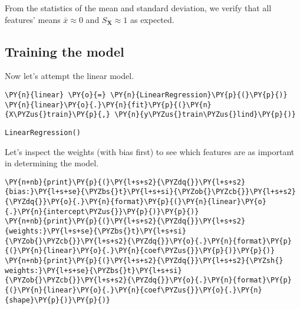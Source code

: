    From the statistics of the mean and standard deviation, we verify that
all features' means \(\bar{x} \approx 0\) and
\(S_{\mathbf{X}} \approx 1\) as expected.

    \hypertarget{training-the-model}{%
\subsection{Training the model}\label{training-the-model}}

    Now let's attempt the linear model.

    \begin{tcolorbox}[breakable, size=fbox, boxrule=1pt, pad at break*=1mm,colback=cellbackground, colframe=cellborder]
\begin{Verbatim}[commandchars=\\\{\}]
\PY{n}{linear} \PY{o}{=} \PY{n}{LinearRegression}\PY{p}{(}\PY{p}{)}
\PY{n}{linear}\PY{o}{.}\PY{n}{fit}\PY{p}{(}\PY{n}{X\PYZus{}train}\PY{p}{,} \PY{n}{y\PYZus{}train\PYZus{}lind}\PY{p}{)}
\end{Verbatim}
\end{tcolorbox}

            \begin{tcolorbox}[breakable, size=fbox, boxrule=.5pt, pad at break*=1mm, opacityfill=0]
\begin{Verbatim}[commandchars=\\\{\}]
LinearRegression()
\end{Verbatim}
\end{tcolorbox}
        
    Let's inspect the weights (with bias first) to see which features are as
important in determining the model.

    \begin{tcolorbox}[breakable, size=fbox, boxrule=1pt, pad at break*=1mm,colback=cellbackground, colframe=cellborder]
\begin{Verbatim}[commandchars=\\\{\}]
\PY{n+nb}{print}\PY{p}{(}\PY{l+s+s2}{\PYZdq{}}\PY{l+s+s2}{bias:}\PY{l+s+se}{\PYZbs{}t}\PY{l+s+si}{\PYZob{}\PYZcb{}}\PY{l+s+s2}{\PYZdq{}}\PY{o}{.}\PY{n}{format}\PY{p}{(}\PY{n}{linear}\PY{o}{.}\PY{n}{intercept\PYZus{}}\PY{p}{)}\PY{p}{)}
\PY{n+nb}{print}\PY{p}{(}\PY{l+s+s2}{\PYZdq{}}\PY{l+s+s2}{weights:}\PY{l+s+se}{\PYZbs{}t}\PY{l+s+si}{\PYZob{}\PYZcb{}}\PY{l+s+s2}{\PYZdq{}}\PY{o}{.}\PY{n}{format}\PY{p}{(}\PY{n}{linear}\PY{o}{.}\PY{n}{coef\PYZus{}}\PY{p}{)}\PY{p}{)}
\PY{n+nb}{print}\PY{p}{(}\PY{l+s+s2}{\PYZdq{}}\PY{l+s+s2}{\PYZsh{} weights:}\PY{l+s+se}{\PYZbs{}t}\PY{l+s+si}{\PYZob{}\PYZcb{}}\PY{l+s+s2}{\PYZdq{}}\PY{o}{.}\PY{n}{format}\PY{p}{(}\PY{n}{linear}\PY{o}{.}\PY{n}{coef\PYZus{}}\PY{o}{.}\PY{n}{shape}\PY{p}{)}\PY{p}{)}
\end{Verbatim}
\end{tcolorbox}

